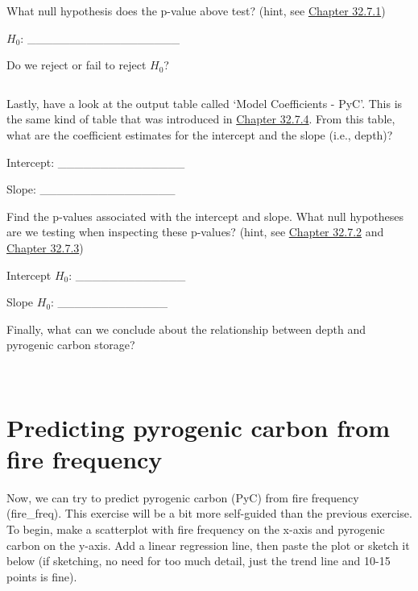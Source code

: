 \documentclass[
]{scrbook}
\begin{document}
\begin{verbatim}
\end{verbatim}

What null hypothesis does the p-value above test? (hint, see \protect\hyperlink{overall-model-significance}{Chapter 32.7.1})

\(H_{0}\): \_\_\_\_\_\_\_\_\_\_\_\_\_\_\_\_\_\_

Do we reject or fail to reject \(H_{0}\)?

\begin{verbatim}
\end{verbatim}

Lastly, have a look at the output table called `Model Coefficients - PyC'.
This is the same kind of table that was introduced in \protect\hyperlink{simple-regression-output}{Chapter 32.7.4}.
From this table, what are the coefficient estimates for the intercept and the slope (i.e., depth)?

Intercept: \_\_\_\_\_\_\_\_\_\_\_\_\_\_\_

Slope: \_\_\_\_\_\_\_\_\_\_\_\_\_\_\_\_

Find the p-values associated with the intercept and slope.
What null hypotheses are we testing when inspecting these p-values? (hint, see \protect\hyperlink{significance-of-the-intercept}{Chapter 32.7.2} and \protect\hyperlink{significance-of-the-slope}{Chapter 32.7.3})

Intercept \(H_{0}\): \_\_\_\_\_\_\_\_\_\_\_\_\_

Slope \(H_{0}\): \_\_\_\_\_\_\_\_\_\_\_\_\_

Finally, what can we conclude about the relationship between depth and pyrogenic carbon storage?

\begin{verbatim}


\end{verbatim}

\hypertarget{predicting-pyrogenic-carbon-from-fire-frequency}{%
\section{Predicting pyrogenic carbon from fire frequency}\label{predicting-pyrogenic-carbon-from-fire-frequency}}

Now, we can try to predict pyrogenic carbon (PyC) from fire frequency (fire\_freq).
This exercise will be a bit more self-guided than the previous exercise.
To begin, make a scatterplot with fire frequency on the x-axis and pyrogenic carbon on the y-axis.
Add a linear regression line, then paste the plot or sketch it below (if sketching, no need for too much detail, just the trend line and 10-15 points is fine).
\end{document}
